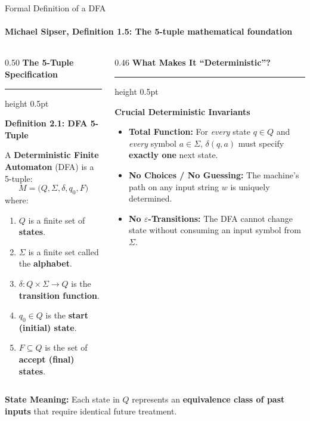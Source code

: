 \documentclass[aspectratio=169, 10pt]{beamer}
\newcommand{\colheader}[1]{%
  {\noindent\footnotesize\bfseries\color{gimpanavy}#1}%
  \vspace{0.02cm}%
  {\color{gimpanavy!30}\hrule height 0.5pt}%
  \vspace{0.05cm}%
}
\newcommand{\cardtitle}[1]{{\noindent\footnotesize\bfseries\color{gimpanavy}#1}\par\vspace{0.03cm}}
\newcommand{\alerttitle}[1]{{\noindent\footnotesize\bfseries\color{accentCrimson}#1}\par\vspace{0.03cm}}
\begin{document}
\begin{frame}{Formal Definition of a DFA}
  \framesubtitle{Michael Sipser, Definition 1.5: The 5-tuple mathematical foundation}
  
  \begin{columns}[T]
    \begin{column}{0.50\textwidth}
      \colheader{The 5-Tuple Specification}
      \begin{tcolorbox}[conceptcard]
        \cardtitle{Definition 2.1: DFA 5-Tuple}
        {\scriptsize
        A \textbf{Deterministic Finite Automaton} (DFA) is a 5-tuple:
        \[ M = \bigl(Q, \Sigma, \delta, q_0, F\bigr) \]
        where:
        \begin{enumerate}\setlength{\itemsep}{2pt}\scriptsize
          \item $Q$ is a finite set of \textbf{states}.
          \item $\Sigma$ is a finite set called the \textbf{alphabet}.
          \item $\delta: Q \times \Sigma \to Q$ is the \textbf{transition function}.
          \item $q_0 \in Q$ is the \textbf{start (initial) state}.
          \item $F \subseteq Q$ is the set of \textbf{accept (final) states}.
        \end{enumerate}
        }
      \end{tcolorbox}
    \end{column}
    
    \begin{column}{0.46\textwidth}
      \colheader{What Makes It ``Deterministic''?}
      \begin{tcolorbox}[alertcard]
        \alerttitle{Crucial Deterministic Invariants}
        \begin{itemize}\setlength{\itemsep}{2.5pt}\scriptsize
          \item \textbf{Total Function:} For \textit{every} state $q \in Q$ and \textit{every} symbol $a \in \Sigma$, $\delta(q, a)$ must specify \textbf{exactly one} next state.
          \item \textbf{No Choices / No Guessing:} The machine's path on any input string $w$ is uniquely determined.
          \item \textbf{No $\varepsilon$-Transitions:} The DFA cannot change state without consuming an input symbol from $\Sigma$.
        \end{itemize}
      \end{tcolorbox}
    \end{column}
  \end{columns}
  
  \vspace{0.08cm}
  \begin{tcolorbox}[spotlightcard]
    {\scriptsize\textbf{State Meaning:} Each state in $Q$ represents an \textbf{equivalence class of past inputs} that require identical future treatment.}
  \end{tcolorbox}
\end{frame}
\end{document}
